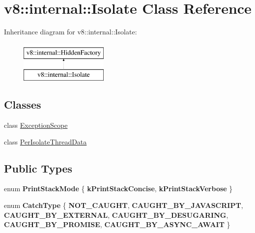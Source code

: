 \hypertarget{classv8_1_1internal_1_1Isolate}{}\section{v8\+:\+:internal\+:\+:Isolate Class Reference}
\label{classv8_1_1internal_1_1Isolate}
Inheritance diagram for v8\+:\+:internal\+:\+:Isolate\+:\begin{figure}[H]
\begin{center}
\leavevmode
\includegraphics[height=2.000000cm]{classv8_1_1internal_1_1Isolate}
\end{center}
\end{figure}
\subsection*{Classes}
\begin{DoxyCompactItemize}
\item 
class \mbox{\hyperlink{classv8_1_1internal_1_1Isolate_1_1ExceptionScope}{Exception\+Scope}}
\item 
class \mbox{\hyperlink{classv8_1_1internal_1_1Isolate_1_1PerIsolateThreadData}{Per\+Isolate\+Thread\+Data}}
\end{DoxyCompactItemize}
\subsection*{Public Types}
\begin{DoxyCompactItemize}
\item 
\mbox{\label{classv8_1_1internal_1_1Isolate_aef5bee5d81ec520bf39817d71191546f}} 
enum {\bfseries Print\+Stack\+Mode} \{ {\bfseries k\+Print\+Stack\+Concise}, 
{\bfseries k\+Print\+Stack\+Verbose}
 \}
\item 
\mbox{\label{classv8_1_1internal_1_1Isolate_a3c9d332f88db6d6acd25098f51700e23}} 
enum {\bfseries Catch\+Type} \{ \newline
{\bfseries N\+O\+T\+\_\+\+C\+A\+U\+G\+HT}, 
{\bfseries C\+A\+U\+G\+H\+T\+\_\+\+B\+Y\+\_\+\+J\+A\+V\+A\+S\+C\+R\+I\+PT}, 
{\bfseries C\+A\+U\+G\+H\+T\+\_\+\+B\+Y\+\_\+\+E\+X\+T\+E\+R\+N\+AL}, 
{\bfseries C\+A\+U\+G\+H\+T\+\_\+\+B\+Y\+\_\+\+D\+E\+S\+U\+G\+A\+R\+I\+NG}, 
\newline
{\bfseries C\+A\+U\+G\+H\+T\+\_\+\+B\+Y\+\_\+\+P\+R\+O\+M\+I\+SE}, 
{\bfseries C\+A\+U\+G\+H\+T\+\_\+\+B\+Y\+\_\+\+A\+S\+Y\+N\+C\+\_\+\+A\+W\+A\+IT}
 \}
\end{DoxyCompactItemize}
